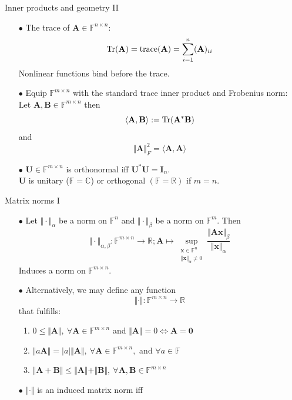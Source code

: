 \documentclass{beamer}
\newcommand{\bgk}[1]{\boldsymbol{#1}}
\newcommand{\bzero}{\bgk{0}}
\newcommand{\bvec}[1]{\mathbf{#1}}
\newcommand{\vx}{\bvec{x}}
\newcommand{\vA}{\bvec{A}}
\newcommand{\vB}{\bvec{B}}
\newcommand{\vI}{\bvec{I}}
\newcommand{\vU}{\bvec{U}}
\begin{document}
\begin{frame}{Inner products and geometry II}

\begin{itemize}
    \item[$\bullet$] The trace of $\vA \in \mathbb{F}^{n\times n}$: 
    $$
    {\rm Tr}(\vA) = {\rm trace} (\vA) = \sum_{i=1}^n (\vA)_{ii}
    $$
    Nonlinear functions bind before the trace.
    \item[$\bullet$] Equip $\mathbb{F}^{m\times n}$ with the standard trace inner product and Frobenius norm:\\
    Let $\vA, \vB \in \mathbb{F}^{m \times n}$ then
    $$\langle \vA, \vB  \rangle := {\rm Tr} (\vA^* \vB)$$
    and
    $$
    \Vert \vA \Vert_{F}^2 =  \langle \vA, \vA  \rangle
    $$
    \item[$\bullet$] $\vU \in \mathbb{F}^{m \times n}$ is orthonormal iff $\vU^* \vU = \vI_{n}$.\\ 
    $\vU$ is unitary ($\mathbb{F} = \mathbb{C}$) or orthogonal $(\mathbb{F} = \mathbb{R})$ if $m=n$.  
\end{itemize}
    
\end{frame}

\begin{frame}{Matrix norms I}

\begin{itemize}
\item[$\bullet$] Let $\Vert \cdot \Vert_{\alpha}$ be a norm on $\mathbb{F}^n$ and $\Vert \cdot \Vert_{\beta}$ be a norm on $\mathbb{F}^m$. Then
$$
\Vert \cdot \Vert_{\alpha, \beta}:\mathbb{F}^{m \times n} \to \mathbb{R}
; \vA \mapsto \sup_{\substack{\vx\in\mathbb{F}^n \\ \Vert \vx \Vert_\alpha \neq 0}}
\frac{\Vert \vA \vx \Vert_{\beta}}{\Vert \vx \Vert_\alpha}
$$
Induces a norm on $\mathbb{F}^{m \times n}$.
\item[$\bullet$] Alternatively, we may define any function
$$
\Vert \cdot \Vert : \mathbb{F}^{m \times n} \to \mathbb{R}
$$
that fulfills:
\begin{enumerate}
    \item $0 \leq \Vert \vA \Vert,~ \forall \vA \in \mathbb{F}^{m \times n}$ and $\Vert \vA \Vert = 0  \Leftrightarrow \vA = \bzero$
    \item $\Vert a \vA \Vert = |a| \Vert \vA \Vert,~ \forall \vA \in \mathbb{F}^{m \times n},$ and $\forall a\in\mathbb{F}$
    \item $\Vert \vA + \vB \Vert \leq \Vert \vA \Vert + \Vert \vB \Vert,~\forall \vA, \vB \in \mathbb{F}^{m \times n}$
\end{enumerate}
\item[$\bullet$] $\Vert \cdot \Vert$ is an induced matrix norm iff 
\end{itemize}

\end{frame}
\end{document}
